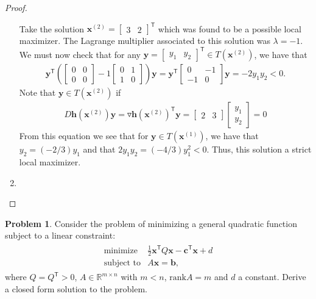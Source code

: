 \documentclass[12pt]{article}
\theoremstyle{definition}
\newtheorem{problem}{Problem}
\newcommand{\vc}[1]{\boldsymbol{#1}}
\newcommand{\tran}{\mathsf{T}}
\begin{document}
\begin{proof}
\begin{enumerate}
      Take the solution $\vc{x}^{(2)} = \begin{bmatrix}3 & 2\end{bmatrix}^\tran$ which was found to be
      a possible local maximizer. The Lagrange multiplier associated to this solution was $\lambda=-1$. We must
      now check that for any $\vc{y} = \begin{bmatrix}y_1 & y_2\end{bmatrix}^\tran\in T(\vc{x}^{(2)})$, we have that
      \begin{align*}
        \vc{y}^\tran \left(\begin{bmatrix}0 & 0 \\ 0 & 0\end{bmatrix} -1 \begin{bmatrix}0 & 1 \\ 1 & 0\end{bmatrix}\right) \vc{y} =
        \vc{y}^\tran \begin{bmatrix}0 & -1 \\ -1 & 0\end{bmatrix} \vc{y} = -2y_1 y_2 < 0.
      \end{align*}
      Note that $\vc{y}\in T(\vc{x}^{(2)})$ if
      \begin{align*}
        D \vc{h}(\vc{x}^{(2)})\vc{y} = \triangledown \vc{h}(\vc{x}^{(2)})^\tran \vc{y} = \begin{bmatrix}2 & 3\end{bmatrix}\begin{bmatrix}y_1 \\ y_2\end{bmatrix} = 0
      \end{align*}
      From this equation we see that for $\vc{y}\in T(\vc{x}^{(1)})$, we have that $y_2 = (-2/3 )y_1$ and that $2y_1 y_2 = (-4/3)y_1^2 < 0$.
      Thus, this solution a strict local maximizer.

    \item
  \end{enumerate}
\end{proof}
\newpage


\begin{problem}
  Consider the problem of minimizing a general quadratic function subject to a linear constraint:
  \begin{align*}
    \begin{array}{rl}
      \text{minimize} & \frac{1}{2} \vc{x}^\tran Q \vc{x} - \vc{c}^\tran \vc{x} + d\\
      \text{subject to} & A\vc{x} = \vc{b},
    \end{array}
  \end{align*}
  where $Q=Q^\tran > 0$, $A \in\mathbb{R}^{m \times n}$ with $m<n$, $\text{rank} A = m$ and $d$ a constant.
  Derive a closed form solution to the problem.
\end{problem}
\end{document}
